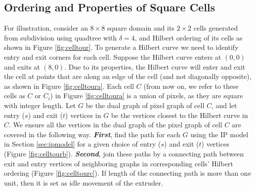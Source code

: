 \subsection{Ordering and Properties of Square Cells} \label{ssec:squarecells}

For illustration, consider an $8 \times 8$ square domain and its $2 \times 2$ cells generated from subdivision using quadtree with $\delta = 4$, and Hilbert ordering of its cells as shown in Figure \ref{fig:celltour}.
To generate a Hilbert curve we need to identify entry and exit corners for each cell.
Suppose the Hilbert curve enters at $(0, 0)$ and exits at $(8, 0)$.
Due to its properties, the Hilbert curve will enter and exit the cell at points that are along an edge of the cell (and not diagonally opposite), as shown in Figure \ref{fig:celltoura}.
Each cell $C$ (from now on, we refer to these cells as $C$ or $C_i$) in Figure \ref{fig:celltoura} is a union of pixels, as they are square with integer length.
Let $G$ be the dual graph of pixel graph of cell $C$, and let entry ($s$) and exit ($t$) vertices in $G$ be the vertices closest to the Hilbert curve in $C$.
We ensure all the vertices in the dual graph of the pixel graph of cell $C$ are covered in the following way.
{\bfseries \textit{First}}, find the path for each $G$ using the IP model in Section \ref{sec:ipmodel} for a given choice of entry ($s$) and exit ($t$) vertices (Figure \ref{fig:celltourb}).
{\bfseries \textit{Second}}, join these paths by a connecting path between exit and entry vertices of neighboring graphs in corresponding cells' Hilbert ordering (Figure \ref{fig:celltourc}).
If length of the connecting path is more than one unit, then it is set as idle movement of the extruder.
 

